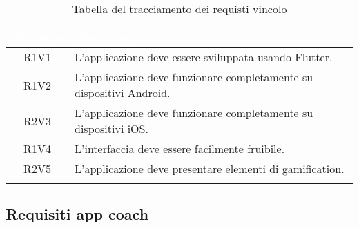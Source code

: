 \setlength\arrayrulewidth{1pt}
\renewcommand{\arraystretch}{1.5}
\begin{longtable}{| c | C{10cm}|}
\label{tab:requisiti-vincolo-cliente}
\textcolor{white}{\textbf{Requisito}} & \textcolor{white}{\textbf{Descrizione}}\\ \hline
\endhead
R1V1 & L'applicazione deve essere sviluppata usando Flutter. \\\hline
R1V2 & L'applicazione deve funzionare completamente su dispositivi Android. \\\hline
R2V3 & L'applicazione deve funzionare completamente su dispositivi iOS. \\\hline
R1V4 & L'interfaccia deve essere facilmente fruibile. \\\hline
R2V5 & L'applicazione deve presentare elementi di \gls{gamification}.\\\hline
\caption{Tabella del tracciamento dei requisti vincolo}
\end{longtable}

\subsection{Requisiti app coach}

